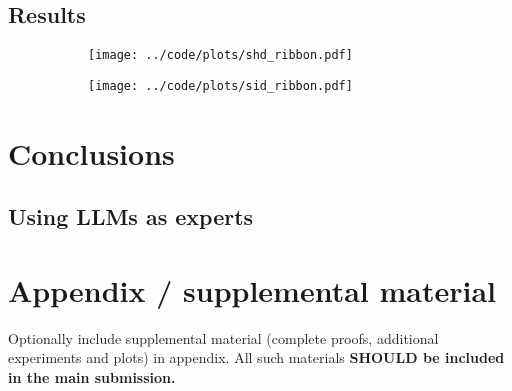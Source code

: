\documentclass{article}
\begin{document}
\subsection{Results}
\begin{figure}
	\begin{subfigure}{0.5\textwidth}
		\texttt{[image: ../code/plots/shd\_ribbon.pdf]}
	\end{subfigure}%
	\begin{subfigure}{0.5\textwidth}
		\texttt{[image: ../code/plots/sid\_ribbon.pdf]}
	\end{subfigure}
\end{figure}

\section{Conclusions}
\subsection{Using LLMs as experts}







\appendix

\section{Appendix / supplemental material}


Optionally include supplemental material (complete proofs, additional experiments and plots) in appendix.
All such materials \textbf{SHOULD be included in the main submission.}



\end{document}
